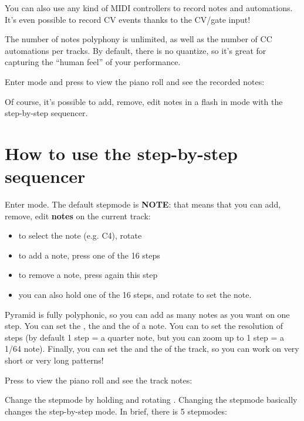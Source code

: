 You can also use any kind of MIDI controllers to record notes and automations. It's even possible to record CV events thanks to the CV/gate input!

The number of notes polyphony is unlimited, as well as the number of CC automations per tracks. By default, there is no quantize, so it's great for capturing the ``human feel'' of your performance.

Enter  mode and press  to view the piano roll and see the recorded notes:


Of course, it's possible to add, remove, edit notes in a flash in  mode with the step-by-step sequencer.


\section{How to use the step-by-step sequencer}

Enter  mode. The default stepmode is \textbf{NOTE}: that means that you can add, remove, edit \textbf{notes} on the current track:

\begin{itemize}
\item to select the note (e.g. C4), rotate \encodericon{}
\item to add a note, press one of the 16 steps \stepbystepicon{}
\item to remove a note, press again this step \stepbystepicon{}
\item you can also hold one of the 16 steps, and rotate \encodericon{} to set the note.
\end{itemize}

Pyramid is fully polyphonic, so you can add as many notes as you want on one step. You can set the , the  and the  of a note. You can  to set the resolution of steps (by default 1 step = a quarter note, but you can zoom up to 1 step = a 1/64 note). Finally, you can set the  and the  of the track, so you can work on very short or very long patterns!

Press  to view the piano roll and see the track notes:


Change the stepmode by holding  and rotating \encodericon{}. Changing the stepmode basically changes the step-by-step mode. In brief, there is 5 stepmodes:

